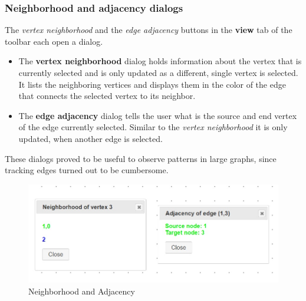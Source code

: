 {\subsubsection{Neighborhood and adjacency dialogs}
\label{NandA}
The \textit{vertex neighborhood} and the \textit{edge adjacency} buttons in the \textbf{view} tab of the toolbar each open a dialog. \\
\begin{itemize}
\item The \textbf{vertex neighborhood} dialog holds information about the vertex that is currently selected and is only updated as a different, single vertex is selected. It lists the neighboring vertices and displays them in the color of the edge that connects the selected vertex to its neighbor.
\item The \textbf{edge adjacency} dialog tells the user what is the source and end vertex of the edge currently selected. Similar to the \textit{vertex neighborhood} it is only updated, when another edge is selected.
\end{itemize}
These dialogs proved to be useful to observe patterns in large graphs, since tracking edges turned out to be cumbersome.
\begin{figure}[!h]
\begin{center}
\includegraphics[width=1\textwidth]{figures/figSecond/NeighborAdjac.jpg}
\caption{Neighborhood and Adjacency}
\label{img:plzhltr}
\end{center}
\end{figure}

}
